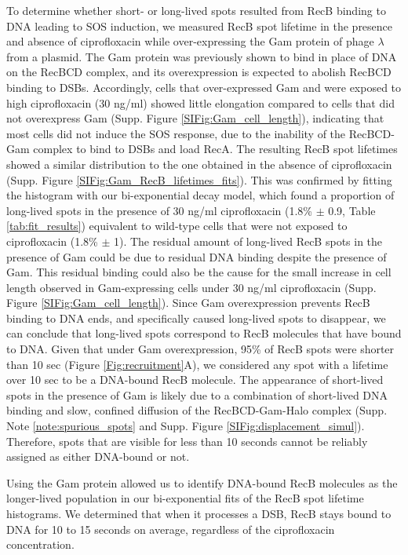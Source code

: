 To determine whether short- or long-lived spots resulted from RecB binding to DNA leading to SOS induction, we measured RecB spot lifetime in the presence and absence of ciprofloxacin while over-expressing the Gam protein of phage $\lambda$ from a plasmid. The Gam protein was previously shown to bind in place of DNA on the RecBCD complex\cite{Wilkinson2016}, and its overexpression is expected to abolish RecBCD binding to DSBs. Accordingly, cells that over-expressed Gam and were exposed to high ciprofloxacin (30 ng/ml) showed little elongation compared to cells that did not overexpress Gam (Supp. Figure \ref{SIFig:Gam_cell_length}), indicating that most cells did not induce the SOS response, due to the inability of the RecBCD-Gam complex to bind to DSBs and load RecA. The resulting RecB spot lifetimes showed a similar distribution to the one obtained in the absence of ciprofloxacin (Supp. Figure \ref{SIFig:Gam_RecB_lifetimes_fits}). This was confirmed by fitting the histogram with our bi-exponential decay model, which found a proportion of long-lived spots in the presence of 30 ng/ml ciprofloxacin (1.8\% $\pm$ 0.9, Table \ref{tab:fit_results}) equivalent to wild-type cells that were not exposed to ciprofloxacin (1.8\% $\pm$ 1). The residual amount of long-lived RecB spots in the presence of Gam could be due to residual DNA binding despite the presence of Gam. This residual binding could also be the cause for the small increase in cell length observed in Gam-expressing cells under 30 ng/ml ciprofloxacin (Supp. Figure \ref{SIFig:Gam_cell_length}). Since Gam overexpression prevents RecB binding to DNA ends, and specifically caused long-lived spots to disappear, we can conclude that long-lived spots correspond to RecB molecules that have bound to DNA. Given that under Gam overexpression, 95\% of RecB spots were shorter than 10 sec (Figure \ref{Fig:recruitment}A), we considered any spot with a lifetime over 10 sec to be a DNA-bound RecB molecule. The appearance of short-lived spots in the presence of Gam is likely due to a combination of short-lived DNA binding and slow, confined diffusion of the RecBCD-Gam-Halo complex (Supp. Note \ref{note:spurious_spots} and Supp. Figure \ref{SIFig:displacement_simul}). Therefore, spots that are visible for less than 10 seconds cannot be reliably assigned as either DNA-bound or not.

Using the Gam protein allowed us to identify DNA-bound RecB molecules as the longer-lived population in our bi-exponential fits of the RecB spot lifetime histograms. We determined that when it processes a DSB, RecB stays bound to DNA for 10 to 15 seconds on average, regardless of the ciprofloxacin concentration.


